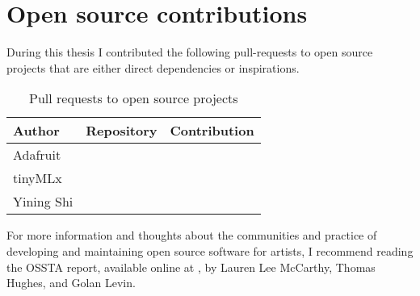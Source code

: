 \chapter{Open source contributions}

During this thesis I contributed the following \glspl{pull-request} to open source projects that are either direct dependencies or inspirations.

\begin{table}[ht]
    \centering
    \begin{tabular}{ | l | l | l |}
        \hline
        Author & Repository & Contribution \\
        \hline
        Adafruit & \cite[Adafruit{\_}SSD1306]{repository-adafruit-adafruit_ssd1306} & \cite[Format binary numbers]{pull-request-adafruit-adafruit_ssd1306} \\
        \hline
        tinyMLx & \cite[TinyMLx Arduino Library]{repository-tinymlx-arduino-library} & \cite[Update architecture name]{pull-request-tinymlx-arduino-library} \\
        \hline
        Yining Shi & \cite[ML for Physical Computing]{repository-yining1023-machine-learning-for-physical-computing} & \cite[Fixed some typos]{pull-request-yining1023-machine-learning-for-physical-computing} \\
        \hline
    \end{tabular}
    \caption{Pull requests to open source projects}
    \label{table:open-source-pull-requests}
\end{table}{}

For more information and thoughts about the communities and practice of developing and maintaining open source software for artists, I recommend reading the \acrfull{OSSTA} report, available online at \cite{website-repository-ossta-report}, by Lauren Lee McCarthy, Thomas Hughes, and Golan Levin.
